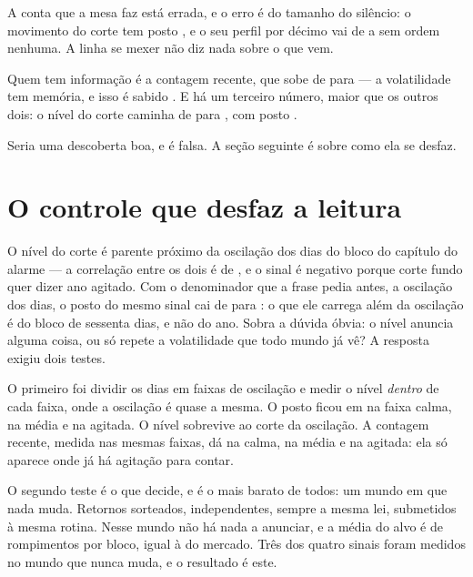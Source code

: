 A conta que a mesa faz está errada, e o erro é do tamanho do silêncio: o movimento do corte tem
posto \numEstabilidadeMovimentoPosto, e o seu perfil por décimo vai de
\numEstabilidadeMovimentoPrimeiroDecimo{} a \numEstabilidadeMovimentoUltimoDecimo{} sem ordem
nenhuma. A linha se mexer não diz nada sobre o que vem.

Quem tem informação é a contagem recente, que sobe de
\numEstabilidadeContagemPrimeiroDecimo{} para \numEstabilidadeContagemUltimoDecimo{} --- a
volatilidade tem memória, e isso é sabido \cite{engle1982autoregressive}. E há um terceiro número, maior que os outros dois: o
nível do corte caminha de \numEstabilidadeNivelPrimeiroDecimo{} para
\numEstabilidadeNivelUltimoDecimo, com posto \numEstabilidadeNivelPosto.

Seria uma descoberta boa, e é falsa. A seção seguinte é sobre como ela se desfaz.

\section{O controle que desfaz a leitura}

O nível do corte é parente próximo da oscilação dos \numEstabilidadeOscilacaoBloco{} dias do bloco do
capítulo do alarme --- a correlação entre os dois é
de \numEstabilidadeNivelComOscilacaoPosto, e o sinal é negativo porque corte fundo quer dizer
ano agitado. Com o denominador que a frase pedia antes, a oscilação dos
\numEstabilidadeOscilacaoAno{} dias, o posto do mesmo sinal cai de \numEstabilidadeRelativoPosto{} para
\numEstabilidadeRelativoAnoPosto{}: o que ele carrega além da oscilação é do bloco de sessenta dias, e
não do ano. Sobra a dúvida óbvia: o nível anuncia alguma coisa, ou só repete a volatilidade que
todo mundo já vê? A resposta exigiu dois testes.

O primeiro foi dividir os dias em faixas de oscilação e medir o nível \emph{dentro} de cada
faixa, onde a oscilação é quase a mesma. O posto ficou em \numEstabilidadeFaixaBaixaNivelPosto{}
na faixa calma, \numEstabilidadeFaixaMediaNivelPosto{} na média e
\numEstabilidadeFaixaAltaNivelPosto{} na agitada. O nível sobrevive ao corte da oscilação. A contagem recente, medida nas mesmas faixas, dá
\numEstabilidadeFaixaBaixaContagemPosto{} na calma, \numEstabilidadeFaixaMediaContagemPosto{} na média e
\numEstabilidadeFaixaAltaContagemPosto{} na agitada: ela só aparece onde já há agitação para contar.

O segundo teste é o que decide, e é o mais barato de todos: um mundo em que nada muda. Retornos
sorteados, independentes, sempre a mesma lei, submetidos à mesma rotina. Nesse mundo não há nada
a anunciar, e a média do alvo é de \numEstabilidadeControleFuturoMedio{} rompimentos por bloco,
igual à do mercado. Três dos quatro sinais foram medidos no mundo que nunca muda, e o resultado é
este.

